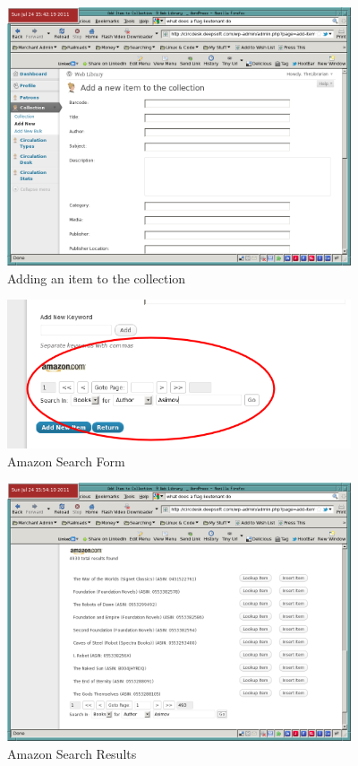 \documentclass[letterpaper,twoside]{article}
\begin{document}
\begin{figure}[htbp]
\begin{centering}
\includegraphics[width=4in]{AddItem.png}
\caption{Adding an item to the collection}
\label{fig:AddItem}
\end{centering}
\end{figure}
\begin{figure}[htbp]
\begin{centering}
\includegraphics[width=4in]{AmazonSearch.png}
\caption{Amazon Search Form}
\label{fig:AmazonSearch}
\end{centering}
\end{figure}
\begin{figure}[htbp]
\begin{centering}
\includegraphics[width=4in]{AmazonSearchResults.png}  
\caption{Amazon Search Results}
\label{fig:AmazonSearchResults}
\end{centering}
\end{figure}
\end{document}
